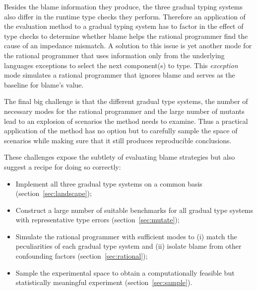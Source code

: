 Besides the blame information they produce, the three gradual typing
systems also differ in the runtime type checks they perform. Therefore an
application of the evaluation method to a gradual typing system has to
factor in the effect of type checks to determine whether blame helps the
rational programmer find the cause of an impedance mismatch. A solution to this issue
is yet another mode for the rational programmer that uses information only
from the underlying languages exceptions to select the next component(s) to type.
This \emph{exception} mode simulates a rational programmer that ignores
blame and serves as the baseline for blame's value.


The final big challenge is that the different gradual type
systems, the number of necessary modes for the rational programmer
and the large number of mutants lead to an explosion of scenarios the
method needs to examine. Thus a practical application of the
method has no option but to carefully sample the space of scenarios while 
making sure that it still produces reproducible conclusions.


\smallskip

These challenges expose the subtlety of evaluating blame strategies but
also suggest a recipe for doing so correctly:

\begin{itemize}

\item Implement all three gradual type systems on a common
  basis (section~\ref{sec:landscape});

\item Construct a large number of suitable benchmarks for all gradual type
  systems with representative
  type errors  (section~\ref{sec:mutate}); 
    
\item Simulate the rational programmer with sufficient 
  modes to (i) match the peculiarities of each gradual type system and 
    (ii) isolate blame from other confounding factors
    (section~\ref{sec:rational});



\item Sample the experimental space  to obtain a computationally feasible
  but statistically meaningful experiment (section~\ref{sec:sample}).

\end{itemize}

